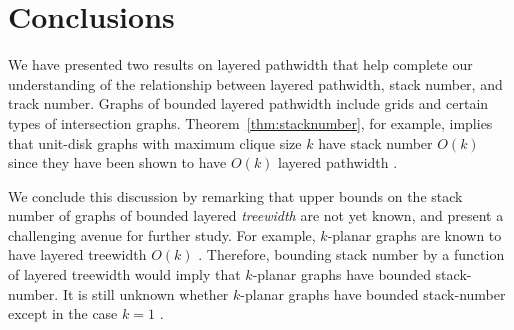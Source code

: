 \documentclass{jgaa-art}
\newcommand{\thmref}[1]{Theorem~\ref{thm:#1}}
\begin{document}
\section{Conclusions}

We have presented two results on layered pathwidth that help complete our understanding of the relationship between layered pathwidth, stack number, and track number.  Graphs of bounded layered pathwidth include grids and certain types of intersection graphs.  \thmref{stacknumber}, for example, implies that unit-disk graphs with maximum clique size $k$ have stack number $O(k)$ since they have been shown to have $O(k)$ layered pathwidth \cite{DBLP:conf/gd/BannisterDDEW16,bannister2018track}.


We conclude this discussion by remarking that upper bounds on the stack number of graphs of bounded layered \emph{treewidth} are not yet known, and present a challenging avenue for further study.  For example, $k$-planar graphs are known to have layered treewidth $O(k)$ \cite[Theorem~3.1]{DBLP:journals/siamdm/DujmovicEW17}.  Therefore, bounding stack number by a function of layered treewidth would imply that $k$-planar graphs have bounded stack-number. It is still unknown whether $k$-planar graphs have bounded stack-number except in the case $k=1$ \cite{DBLP:journals/algorithmica/BekosBKR17,DBLP:journals/corr/AlamBK15}.




\end{document}
